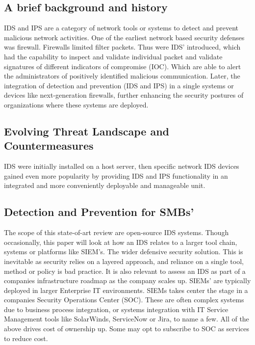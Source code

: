 \subsection{A brief background and history}

IDS and IPS are a category of network tools or systems to detect and prevent malicious network activities. One of the earliest network based security defenses was firewall. Firewalls limited filter packets. Thus were IDS' introduced, which had the capability to inspect and validate individual packet and validate signatures of different indicators of compromise (IOC). Which are able to alert the administrators of positively identified malicious communication. Later, the integration of detection and prevention (IDS and IPS) in a single systems or devices like next-generation firewalls, further enhancing the security postures of organizations where these systems are deployed.

\subsection{Evolving Threat Landscape and Countermeasures}

IDS were initially installed on a host server, then specific network IDS devices gained even more popularity by providing IDS and IPS functionality in an integrated and more conveniently deployable and manageable unit.
\newpage
\subsection{Detection and Prevention for SMBs'}

The scope of this state-of-art review are open-source IDS systems. Though occasionally, this paper will look at how an IDS relates to a larger tool chain, systems or platforms like SIEM's. The wider defensive security solution. This is inevitable as security relies on a layered approach, and reliance on a single tool, method or policy is bad practice. It is also relevant to assess an IDS as part of a companies infrastructure roadmap as the company scales up. SIEMs' are typically deployed in larger Enterprise IT environments. SIEMs takes center the stage in a companies Security Operations Center (SOC). These are often complex systems due to business process integration, or systems integration with IT Service Management tools like SolarWinds, ServiceNow or Jira, to name a few. All of the above drives cost of ownership up. Some may opt to subscribe to SOC as services to reduce cost.


